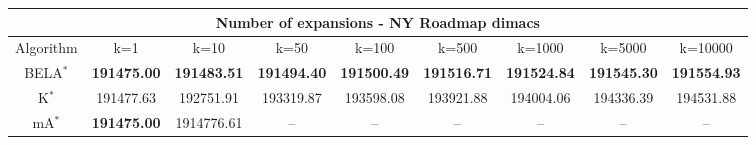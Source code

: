 \begin{tabular}{c|cccccccc}\toprule
\multicolumn{9}{c}{Number of expansions - NY Roadmap dimacs}\\ \midrule
Algorithm & k=1 & k=10 & k=50 & k=100 & k=500 & k=1000 & k=5000 & k=10000 \\ \midrule
BELA$^*$ & \textbf{191475.00} & \textbf{191483.51} & \textbf{191494.40} & \textbf{191500.49} & \textbf{191516.71} & \textbf{191524.84} & \textbf{191545.30} & \textbf{191554.93} \\
K$^*$ & 191477.63 & 192751.91 & 193319.87 & 193598.08 & 193921.88 & 194004.06 & 194336.39 & 194531.88 \\
mA$^*$ & \textbf{191475.00} & 1914776.61 & -- & -- & -- & -- & -- & -- \\ \bottomrule 
\end{tabular}
